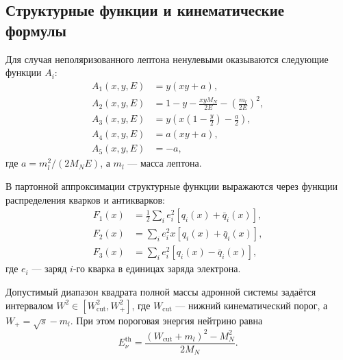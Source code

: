 \subsection{Структурные функции и кинематические формулы}
\label{app:structure_functions}

Для случая неполяризованного лептона ненулевыми оказываются следующие функции $A_i$:
\begin{equation}
    \begin{aligned}
        A_1(x, y, E) &= y(xy + a), \\
        A_2(x, y, E) &= 1 - y - \frac{xyM_N}{2E} - \left( \frac{m_{l}}{2E} \right)^2, \\
        A_3(x, y, E) &= y\left( x\left(1 - \frac{y}{2} \right) - \frac{a}{2} \right), \\
        A_4(x, y, E) &= a(xy + a), \\
        A_5(x, y, E) &= -a,
    \end{aligned}
\end{equation}
где $a = m_l^2/(2M_N E)$, а $m_l$ — масса лептона.

В партонной аппроксимации структурные функции выражаются через функции распределения кварков и антикварков:
\begin{equation}
    \begin{aligned}
        F_1(x) &= \frac{1}{2} \sum\limits_{i} e_i^2 \left[ q_i(x) + \bar{q}_i(x) \right], \\
        F_2(x) &= \sum\limits_{i} e_i^2 x \left[ q_i(x) + \bar{q}_i(x) \right], \\
        F_3(x) &= \sum\limits_{i} e_i^2 \left[ q_i(x) - \bar{q}_i(x) \right],
    \end{aligned}
\end{equation}
где $e_i$ — заряд $i$-го кварка в единицах заряда электрона.

Допустимый диапазон квадрата полной массы адронной системы задаётся интервалом $W^2 \in [W^2_{\text{cut}}, W_+^2]$, где $W_{\text{cut}}$ — нижний кинематический порог, а $W_+ = \sqrt{s} - m_l$. При этом пороговая энергия нейтрино равна
\begin{equation}
    E_\nu^{\text{th}} = \frac{(W_{\text{cut}} + m_l)^2 - M_N^2}{2M_N}.
\end{equation}

